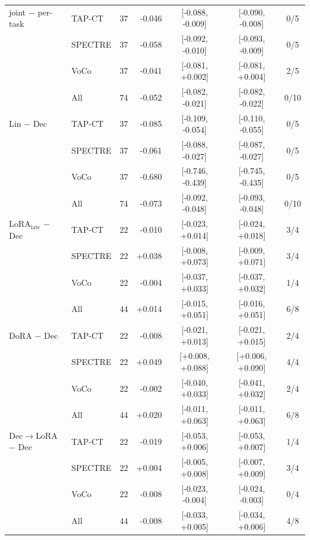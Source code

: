 \begin{tabular}{@{}llrrccc@{}}
joint $-$ per-task & TAP-CT & 37 & -0.046 & [-0.088, -0.009] & [-0.090, -0.008] & 0/5 \\
 & SPECTRE & 37 & -0.058 & [-0.092, -0.010] & [-0.093, -0.009] & 0/5 \\
 & VoCo & 37 & -0.041 & [-0.081, +0.002] & [-0.081, +0.004] & 2/5 \\
 & All & 74 & -0.052 & [-0.082, -0.021] & [-0.082, -0.022] & 0/10 \\
\addlinespace[2pt]
Lin $-$ Dec & TAP-CT & 37 & -0.085 & [-0.109, -0.054] & [-0.110, -0.055] & 0/5 \\
 & SPECTRE & 37 & -0.061 & [-0.088, -0.027] & [-0.087, -0.027] & 0/5 \\
 & VoCo & 37 & -0.680 & [-0.746, -0.439] & [-0.745, -0.435] & 0/5 \\
 & All & 74 & -0.073 & [-0.092, -0.048] & [-0.093, -0.048] & 0/10 \\
\addlinespace[2pt]
LoRA$_{\text{late}}$ $-$ Dec & TAP-CT & 22 & -0.010 & [-0.023, +0.014] & [-0.024, +0.018] & 3/4 \\
 & SPECTRE & 22 & +0.038 & [-0.008, +0.073] & [-0.009, +0.071] & 3/4 \\
 & VoCo & 22 & -0.004 & [-0.037, +0.033] & [-0.037, +0.032] & 1/4 \\
 & All & 44 & +0.014 & [-0.015, +0.051] & [-0.016, +0.051] & 6/8 \\
\addlinespace[2pt]
DoRA $-$ Dec & TAP-CT & 22 & -0.008 & [-0.021, +0.013] & [-0.021, +0.015] & 2/4 \\
 & SPECTRE & 22 & +0.049 & [+0.008, +0.088] & [+0.006, +0.090] & 4/4 \\
 & VoCo & 22 & -0.002 & [-0.040, +0.033] & [-0.041, +0.032] & 2/4 \\
 & All & 44 & +0.020 & [-0.011, +0.063] & [-0.011, +0.063] & 6/8 \\
\addlinespace[2pt]
Dec$\to$LoRA $-$ Dec & TAP-CT & 22 & -0.019 & [-0.053, +0.006] & [-0.053, +0.007] & 1/4 \\
 & SPECTRE & 22 & +0.004 & [-0.005, +0.008] & [-0.007, +0.009] & 3/4 \\
 & VoCo & 22 & -0.008 & [-0.023, -0.004] & [-0.024, -0.003] & 0/4 \\
 & All & 44 & -0.008 & [-0.033, +0.005] & [-0.034, +0.006] & 4/8 \\
\bottomrule
\end{tabular}
